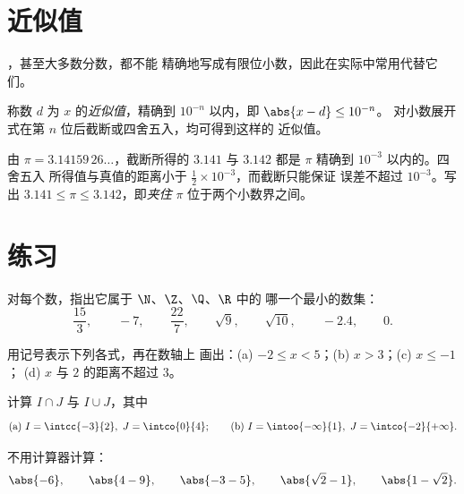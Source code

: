 \section{近似值}

，甚至大多数分数，都不能
精确地写成有限位小数，因此在实际中常用代替它们。

\begin{definition}[给定精度的近似值]\label{def:g10:numbers:approx}
称数 $d$ 为 $x$ 的\emph{近似值}，精确到
$10^{-n}$ 以内，即 $\abs{x - d} \leq 10^{-n}$。
对小数展开式在第 $n$ 位后截断或四舍五入，均可得到这样的
近似值。
\end{definition}

\begin{example}
由 $\pi = 3.14159\,26\dots$，截断所得的 $3.141$ 与
$3.142$ 都是 $\pi$ 精确到 $10^{-3}$ 以内的。四舍五入
所得值与真值的距离小于 $\frac12 \times 10^{-3}$，而截断只能保证
误差不超过 $10^{-3}$。写出 $3.141 \leq \pi \leq 3.142$，即\emph{夹住}
$\pi$ 位于两个小数界之间。
\end{example}

\section{练习}

\begin{exercise}[$\star$]\label{exo:g10:numbers:1}
对每个数，指出它属于 $\N$、$\Z$、$\Q$、$\R$ 中的
哪一个最小的数集：
\[
\frac{15}{3}, \qquad -7, \qquad \frac{22}{7}, \qquad \sqrt{9}, \qquad
\sqrt{10}, \qquad -2.4, \qquad 0 .
\]
\end{exercise}

\begin{exercise}[$\star$]\label{exo:g10:numbers:2}
用记号表示下列各式，再在数轴上
画出：(a) $-2 \leq x < 5$；(b) $x > 3$；(c) $x \leq -1$；
(d) $x$ 与 $2$ 的距离不超过 $3$。
\end{exercise}

\begin{exercise}[$\star$]\label{exo:g10:numbers:3}
计算 $I \cap J$ 与 $I \cup J$，其中
\[
\text{(a) } I = \intcc{-3}{2},\ J = \intco{0}{4};
\qquad
\text{(b) } I = \intoo{-\infty}{1},\ J = \intco{-2}{+\infty}.
\]
\end{exercise}

\begin{exercise}[$\star$]\label{exo:g10:numbers:4}
不用计算器计算：
\[
\abs{-6}, \qquad \abs{4 - 9}, \qquad \abs{-3 - 5}, \qquad
\abs{\sqrt 2 - 1}, \qquad \abs{1 - \sqrt 2}.
\]
\end{exercise}

